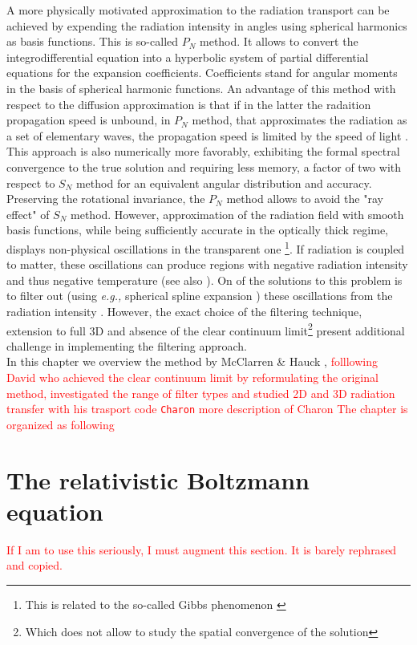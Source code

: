 \documentclass[11pt,a4paper,headinclude=true,DIV=14,BCOR=8mm,chapterprefix,listof=totoc,twoside,openright,abstracton]{scrbook}
\begin{document}
A more physically motivated approximation to the radiation transport can be achieved by expending the radiation intensity in angles using spherical harmonics as basis functions. This is so-called $P_N$ method. It allows to convert the integrodifferential equation into a hyperbolic system of partial differential equations for the expansion coefficients. Coefficients stand for angular moments in the basis of spherical harmonic functions. An advantage of this method with respect to the diffusion approximation is that if in the latter the radaition propagation speed is unbound, in $P_N$ method, that approximates the radiation as a set of elementary waves, the propagation speed is limited by the speed of light \cite{McClarren:2008b}. This approach is also numerically more favorably, exhibiting the formal spectral convergence to the true solution and requiring less memory, a factor of two with respect to $S_N$ method for an equivalent angular distribution and accuracy. Preserving the rotational invariance, the $P_N$ method allows to avoid the "ray effect" of $S_N$ method. However, approximation of the radiation field with smooth basis functions, while being sufficiently accurate in the optically thick regime, displays non-physical oscillations in the transparent one \footnote{This is related to the so-called Gibbs phenomenon \cite{Boyd:2001}}. If radiation is coupled to matter, these oscillations can produce regions with negative radiation intensity and thus negative temperature \cite{McClarren:2008b,Olson:2009} (see also \cite{Olson:2000,Olson:2009,Brunner:2001,McClarren:2010,Olson:2012,Hauck:2010}). On of the solutions to this problem is to filter out (using \textit{e.g.,} spherical spline expansion \cite{Boyd:2001}) these oscillations from the radiation intensity \cite{McClarren:2010}. However, the exact choice of the filtering technique, extension to full 3D and absence of the clear continuum limit\footnote{Which does not allow to study the spatial convergence of the solution} present additional challenge in implementing the filtering approach. \\
%
In this chapter we overview the method by McClarren \& Hauck \cite{McClarren:2010}, \textcolor{red}{folllowing David  who achieved the clear continuum limit by reformulating the original method, investigated the range of filter types and studied 2D and 3D radiation transfer with his trasport code \texttt{Charon}} 
\textcolor{red}{more description of Charon}
\textcolor{red}{The chapter is organized as following}


\section{The relativistic Boltzmann equation}
\textcolor{red}{If I am to use this seriously, I must augment this section. It is barely rephrased and copied.}
\end{document}
